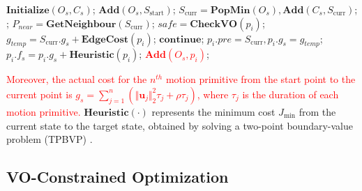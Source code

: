 \documentclass[preprint,5p,times,twocolumn,authoryear]{elsarticle}
\begin{document}
\begin{algorithm}
\caption{VO-Guided Path Searching.}\label{algorithm.1}
\begin{algorithmic}[1]
\STATE $\textbf{Initialize}(O_s,C_s)$;\;
\STATE $\textbf{Add}(O_s,S_\text{start})$;\;
\STATE $S_\text{curr} = \textbf{PopMin}(O_s), \textbf{Add}(C_s,S_\text{curr})$;\;
;
\ENDIF
\STATE $P_{near} = \textbf{GetNeighbour}(S_\text{curr})$;\;
\STATE $safe = \textbf{CheckVO}(p_i)$;\;
\STATE $g_{temp} = S_\text{curr}.g_s+\textbf{EdgeCost}(p_i) $;\;
\ENDIF
{}
\STATE $\textbf{continue}$;\;
\ENDIF
\STATE $p_i.pre = S_\text{curr}, p_i.g_s = g_{temp}$;\;
\STATE $p_i.f_s = p_i.g_s+\textbf{Heuristic}(p_i)$;\;
\STATE \textcolor{red}{$\textbf{Add}(O_s, p_i)$};\;
\ENDFOR
\ENDWHILE
\end{algorithmic}
\end{algorithm}

\textcolor{red}{Moreover, the actual cost for the $n^{th}$ motion primitive from the start point to the current point is $g_s = \sum_{j = 1}^{n} ( \Vert \bm{u}_{j} \Vert_2^2 \tau_j + \rho \tau_j )$, where $\tau_j$ is the duration of each motion primitive.} $\textbf{Heuristic}(\cdot)$ represents the minimum cost $J_{\min}$ from the current state to the target state, obtained by solving a two-point boundary-value problem (TPBVP) \citep{bryson2018applied}.

\subsection{VO-Constrained Optimization}
\label{Trajectory_Optimization}
\end{document}
